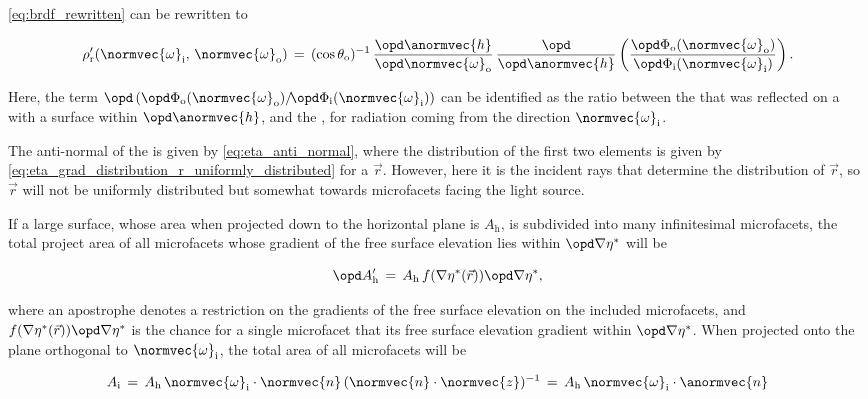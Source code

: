 {\eqref{eq:brdf_rewritten} can be rewritten to

\begin{equation} \label{eq:brdf_from_ratio_between_fluxes}
\rho'_{\text{r}}(\normvec{\omega}_{\text{i}},\, \normvec{\omega}_{\text{o}}) \,=\, (\cos\theta_{\text{o}})^{-1}\, \frac{\opd \anormvec{h}}{\opd \normvec{\omega}_{\text{o}}}\,\frac{\opd}{\opd \anormvec{h}}\left(\frac{\opd \Phi_{\text{o}}(\normvec{\omega}_{\text{o}})}{\opd \Phi_{\text{i}}(\normvec{\omega}_{\text{i}})}\right).
\end{equation}

Here, the term $\opd\,(\opd \Phi_{\text{o}}(\normvec{\omega}_{\text{o}})/\!\opd \Phi_{\text{i}}(\normvec{\omega}_{\text{i}}))$ can be identified as the ratio between the  that was reflected on a \microfacet with a surface  within $\opd \anormvec{h}$, and the , for radiation coming from the direction $\normvec{\omega}_{\text{i}}$.

The anti-normal of the \microfacet is given by \eqref{eq:eta_anti_normal}, where the distribution of the first two elements is given by \eqref{eq:eta_grad_distribution_r_uniformly_distributed} for a  $\vec{r}$. However, here it is the incident rays that determine the distribution of $\vec{r}$, so $\vec{r}$ will not be uniformly distributed but somewhat \biased towards microfacets facing the light source.

If a large surface, whose area when projected down to the horizontal plane is $A_{\text{h}}$, is subdivided into many infinitesimal microfacets, the total project area of all microfacets whose gradient of the free surface elevation lies within $\opd\nabla\eta^*$ will be

\begin{equation}
\opd A'_{\text{h}} \,=\, A_{\text{h}}\,f(\nabla\eta^*(\vec{r}))\opd\nabla\eta^*,
\end{equation}

where an apostrophe denotes a restriction on the gradients of the free surface elevation on the included microfacets, and $f(\nabla\eta^*(\vec{r}))\opd \nabla\eta^*$ is the chance for a single microfacet that its free surface elevation gradient within $\opd\nabla\eta^*$. When projected onto the plane orthogonal to $\normvec{\omega}_{\text{i}}$, the total area of all microfacets will be

\begin{equation}
A_{\text{i}} \,=\, A_{\text{h}}\,\normvec{\omega}_{\text{i}}\cdot\normvec{n}\,(\normvec{n}\cdot\normvec{z})^{-1} \,=\, A_{\text{h}}\,\normvec{\omega}_{\text{i}}\cdot\anormvec{n}
\end{equation}

}

